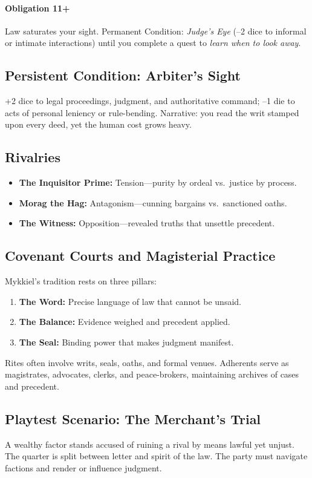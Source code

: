 \paragraph{Obligation 11+} Law saturates your sight. Permanent Condition: \emph{Judge’s Eye} (--2 dice to informal or intimate interactions) until you complete a quest to \emph{learn when to look away}.

\subsection*{Persistent Condition: Arbiter’s Sight}
+2 dice to legal proceedings, judgment, and authoritative command; --1 die to acts of personal leniency or rule-bending. Narrative: you read the writ stamped upon every deed, yet the human cost grows heavy.

\subsection*{Rivalries}
\begin{itemize}
  \item \textbf{The Inquisitor Prime:} Tension—purity by ordeal vs.\ justice by process.
  \item \textbf{Morag the Hag:} Antagonism—cunning bargains vs.\ sanctioned oaths.
  \item \textbf{The Witness:} Opposition—revealed truths that unsettle precedent.
\end{itemize}

\subsection*{Covenant Courts and Magisterial Practice}
Mykkiel’s tradition rests on three pillars:
\begin{enumerate}
  \item \textbf{The Word:} Precise language of law that cannot be unsaid.
  \item \textbf{The Balance:} Evidence weighed and precedent applied.
  \item \textbf{The Seal:} Binding power that makes judgment manifest.
\end{enumerate}
Rites often involve writs, seals, oaths, and formal venues. Adherents serve as magistrates, advocates, clerks, and peace-brokers, maintaining archives of cases and precedent.

\subsection*{Playtest Scenario: The Merchant’s Trial}
A wealthy factor stands accused of ruining a rival by means lawful yet unjust. The quarter is split between letter and spirit of the law. The party must navigate factions and render or influence judgment.

